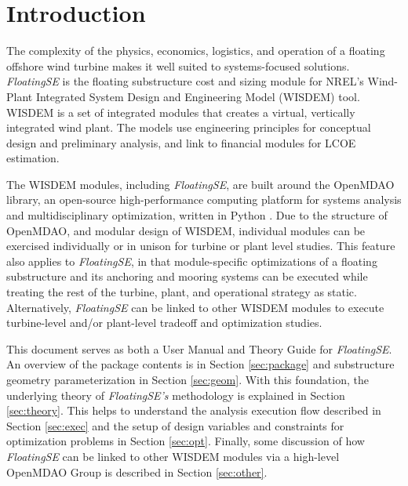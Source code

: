 \chapter{Introduction}
\label{sec:intro}
The complexity of the physics, economics, logistics, and operation of a
floating offshore wind turbine makes it well suited to systems-focused
solutions.  \textit{FloatingSE} is the floating substructure cost and
sizing module for NREL's Wind-Plant Integrated System Design and
Engineering Model (WISDEM) tool.  WISDEM is a set of integrated modules
that creates a virtual, vertically integrated wind plant. The models use
engineering principles for conceptual design and preliminary analysis,
and link to financial modules for LCOE estimation.

The WISDEM modules, including \textit{FloatingSE}, are built around the
OpenMDAO library, an open-source high-performance computing platform for
systems analysis and multidisciplinary optimization, written in Python
\citep{openmdao}.  Due to the structure of OpenMDAO, and modular design
of WISDEM, individual modules can be exercised individually or in unison
for turbine or plant level studies.  This feature also applies to
\textit{FloatingSE}, in that module-specific optimizations of a floating
substructure and its anchoring and mooring systems can be executed while
treating the rest of the turbine, plant, and operational strategy as
static.  Alternatively, \textit{FloatingSE} can be linked to other
WISDEM modules to execute turbine-level and/or plant-level tradeoff and
optimization studies.

This document serves as both a User Manual and Theory Guide for
\textit{FloatingSE}.  An overview of the package contents is in Section
\ref{sec:package} and substructure geometry parameterization in Section
\ref{sec:geom}.  With this foundation, the underlying theory of
\textit{FloatingSE's} methodology is explained in Section
\ref{sec:theory}.  This helps to understand the analysis execution flow
described in Section \ref{sec:exec} and the setup of design variables
and constraints for optimization problems in Section \ref{sec:opt}.
Finally, some discussion of how \textit{FloatingSE} can be linked to
other WISDEM modules via a high-level OpenMDAO Group is described in
Section \ref{sec:other}.
